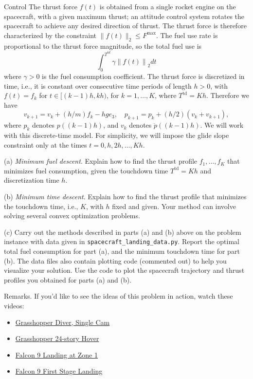 \begin{chapter}{Control}
    \noindent The thrust force $f(t)$ is obtained from a single rocket engine on the spacecraft, with a given maximum thrust; an attitude control system rotates the spacecraft to achieve any desired direction of thrust. The thrust force is therefore characterized by the constraint $\|f(t)\|_2 \leq F^{\mathrm{max}}$. The fuel use rate is proportional to the thrust force magnitude, so the total fuel use is
    \[
    \int_0^{T^{td}} \gamma \left\lVert f(t) \right\rVert_{2} dt
    \]
    where $\gamma>0$ is the fuel consumption coefficient. The thrust force is discretized in time, i.e., it is constant over consecutive time periods of length $h>0$, with $f(t)=f_k$ for $t \in[(k-1) h, k h)$, for $k=1, \ldots, K$, where $T^{\mathrm{td}}=K h$. Therefore we have
    \[
    v_{k+1}=v_k+(h / m) f_k-h g e_3, \quad p_{k+1}=p_k+(h / 2)\left(v_k+v_{k+1}\right),
    \]
    where $p_k$ denotes $p((k-1) h)$, and $v_k$ denotes $\dot{p}((k-1) h)$. We will work with this discrete-time model.
    For simplicity, we will impose the glide slope constraint only at the times $t=0, h, 2 h, \ldots, K h$.

    \vspace{0.2cm}
    \noindent(a) \textit{Minimum fuel descent}. Explain how to find the thrust profile $f_1, \ldots, f_K$ that minimizes fuel consumption, given the touchdown time $T^{\mathrm{td}}=K h$ and discretization time $h$. 
    
    \vspace{0.2cm}
    \noindent(b) \textit{Minimum time descent}. Explain how to find the thrust profile that minimizes the touchdown time, i.e., $K$, with $h$ fixed and given.
    Your method can involve solving several convex optimization problems.

    \vspace{0.2cm}
    \noindent(c) Carry out the methods described in parts (a) and (b) above on the problem instance with data given in \lstinline|spacecraft_landing_data.py|.
    Report the optimal total fuel consumption for part (a), and the minimum touchdown time for part (b). The data files also contain plotting code (commented out) to help you visualize your solution. Use the code to plot the spacecraft trajectory and thrust profiles you obtained for parts (a) and (b).
    
    \vspace{0.2cm}
    \noindent Remarks. If you'd like to see the ideas of this problem in action, watch these videos:
    \begin{itemize}
        \item \href{http://www.youtube.com/watch?v=2t15vP1PyoA}{Grasshopper Diver, Single Cam}
        \item \href{https://www.youtube.com/watch?v=orUjSkc2pG0}{Grasshopper 24-story Hover}
        \item \href{https://www.youtube.com/watch?v=1B6oiLNyKKI}{Falcon 9 Landing at Zone 1}
        \item \href{https://www.youtube.com/watch?v=ZCBE8ocOkAQ}{Falcon 9 First Stage Landing}
    \end{itemize}


\end{chapter}
